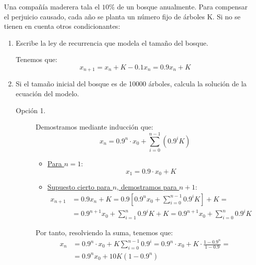 \begin{ejercicio}
    Una compañía maderera tala el $10\%$ de un bosque anualmente. Para compensar el perjuicio causado, cada año se planta un número fijo de árboles K. Si no se tienen en cuenta otros condicionantes:
    \begin{enumerate}
        \item Escribe la ley de recurrencia que modela el tamaño del bosque.

        Tenemos que:
        \begin{equation*}
            x_{n+1} = x_n + K - 0.1x_n = 0.9x_n + K
        \end{equation*}
        
        \item Si el tamaño inicial del bosque es de 10000 árboles, calcula la solución de la ecuación del modelo.

        \begin{description}
            \item[Opción 1.] Demostramos mediante inducción que:
            \begin{equation*}
                x_n = 0.9^n \cdot x_0 + \sum_{i=0}^{n-1}(0.9^iK)
            \end{equation*}
            \begin{itemize}
                \item \ul{Para $n=1$}:
                \begin{equation*}
                    x_1 = 0.9\cdot x_0 + K
                \end{equation*}
    
                \item \ul{Supuesto cierto para $n$, demostramos para $n+1$}:
                \begin{align*}
                    x_{n+1} &= 0.9x_n + K =
                    0.9\left[0.9^nx_0 + \sum_{i=0}^{n-1}0.9^iK\right] + K
                    =\\&= 0.9^{n+1}x_0 + \sum_{i=1}^{n}0.9^iK + K
                    = 0.9^{n+1}x_0 + \sum_{i=0}^{n}0.9^iK
                \end{align*}
            \end{itemize}
    
            Por tanto, resolviendo la suma, tenemos que:
            \begin{align*}
                x_n &= 0.9^n\cdot x_0 + K\sum_{i=0}^{n-1}0.9^i
                = 0.9^n\cdot x_0 + K\cdot \frac{1-0.9^n}{1-0.9}
                =\\&= 0.9^nx_0 + 10K(1-0.9^n)
            \end{align*}


\end{description}
\end{enumerate}
\end{ejercicio}
